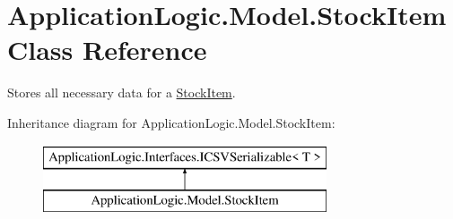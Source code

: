 \hypertarget{class_application_logic_1_1_model_1_1_stock_item}{
\section{ApplicationLogic.Model.StockItem Class Reference}
\label{class_application_logic_1_1_model_1_1_stock_item}
}


Stores all necessary data for a \hyperlink{class_application_logic_1_1_model_1_1_stock_item}{StockItem}.  


Inheritance diagram for ApplicationLogic.Model.StockItem:\begin{figure}[H]
\begin{center}
\leavevmode
\includegraphics[height=2.000000cm]{class_application_logic_1_1_model_1_1_stock_item}
\end{center}
\end{figure}
